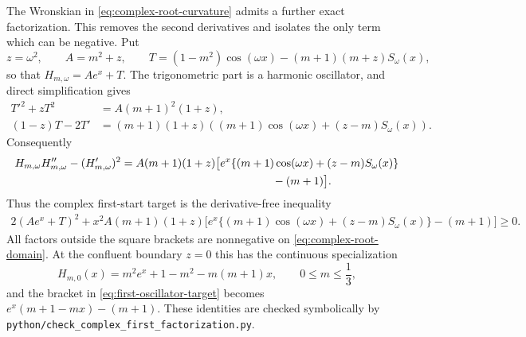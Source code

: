 \documentclass[11pt]{article}
\theoremstyle{remark}
\begin{document}
The Wronskian in \eqref{eq:complex-root-curvature} admits a further exact
factorization.  This removes the second derivatives and isolates the only
term which can be negative.  Put
\[
 z=\omega^2,\qquad A=m^2+z,\qquad
 T=(1-m^2)\cos(\omega x)-(m+1)(m+z)S_\omega(x),
\]
so that $H_{m,\omega}=Ae^x+T$.  The trigonometric part is a harmonic
oscillator, and direct simplification gives
\begin{align}
 T'^2+zT^2&=A(m+1)^2(1+z),\label{eq:first-oscillator-energy}\\
 (1-z)T-2T'
 &=(m+1)(1+z)
 \left((m+1)\cos(\omega x)+(z-m)S_\omega(x)\right).
 \label{eq:first-oscillator-companion}
\end{align}
Consequently
\begin{align}
 H_{m,\omega}H_{m,\omega}''
 -(H_{m,\omega}')^2
 ={}&A(m+1)(1+z)\bigl[
 e^x\{(m+1)\cos(\omega x)+(z-m)S_\omega(x)\}\notag\\
 &\hspace{43mm}{}-(m+1)\bigr].
 \label{eq:first-oscillator-wronskian}
\end{align}
Thus the complex first-start target is the derivative-free inequality
\begin{align}
 2(Ae^x+T)^2
 +x^2A(m+1)(1+z)\bigl[
 e^x\{(m+1)\cos(\omega x)+(z-m)S_\omega(x)\}
 -(m+1)\bigr]\geq0.
 \label{eq:first-oscillator-target}
\end{align}
All factors outside the square brackets are nonnegative on
\eqref{eq:complex-root-domain}.  At the confluent boundary $z=0$ this has
the continuous specialization
\[
 H_{m,0}(x)=m^2e^x+1-m^2-m(m+1)x,\qquad 0\leq m\leq\frac13,
\]
and the bracket in \eqref{eq:first-oscillator-target} becomes
$e^x(m+1-mx)-(m+1)$.  These identities are checked symbolically by
\texttt{python/check\_complex\_first\_factorization.py}.
\end{document}
